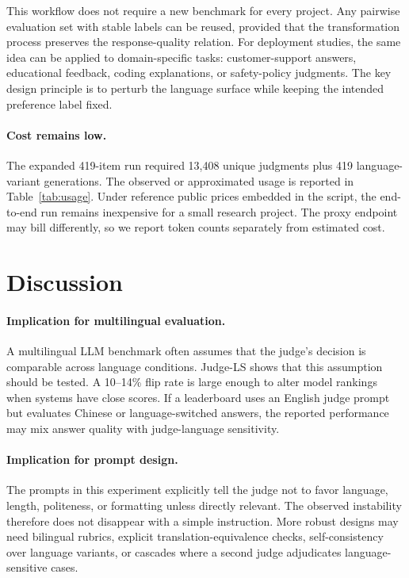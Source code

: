 \documentclass[10pt,twocolumn]{article}
\begin{document}
This workflow does not require a new benchmark for every project. Any pairwise evaluation set with stable labels can be reused, provided that the transformation process preserves the response-quality relation. For deployment studies, the same idea can be applied to domain-specific tasks: customer-support answers, educational feedback, coding explanations, or safety-policy judgments. The key design principle is to perturb the language surface while keeping the intended preference label fixed.

\paragraph{Cost remains low.}
The expanded 419-item run required 13,408 unique judgments plus 419 language-variant generations. The observed or approximated usage is reported in Table~\ref{tab:usage}. Under reference public prices embedded in the script, the end-to-end run remains inexpensive for a small research project. The proxy endpoint may bill differently, so we report token counts separately from estimated cost.

\section{Discussion}

\paragraph{Implication for multilingual evaluation.}
A multilingual LLM benchmark often assumes that the judge's decision is comparable across language conditions. Judge-LS shows that this assumption should be tested. A 10--14\% flip rate is large enough to alter model rankings when systems have close scores. If a leaderboard uses an English judge prompt but evaluates Chinese or language-switched answers, the reported performance may mix answer quality with judge-language sensitivity.

\paragraph{Implication for prompt design.}
The prompts in this experiment explicitly tell the judge not to favor language, length, politeness, or formatting unless directly relevant. The observed instability therefore does not disappear with a simple instruction. More robust designs may need bilingual rubrics, explicit translation-equivalence checks, self-consistency over language variants, or cascades where a second judge adjudicates language-sensitive cases.
\end{document}
